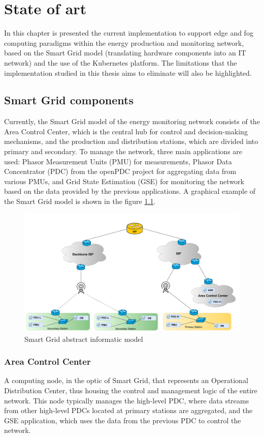 \chapter{State of art}
In this chapter is presented the current implementation to support edge and fog computing paradigms within the energy production and monitoring network, based on the Smart Grid model (translating hardware components into an IT network) and the use of the Kubernetes platform. The limitations that the implementation studied in this thesis aims to eliminate will also be highlighted.

\section{Smart Grid components}
Currently, the Smart Grid model of the energy monitoring network consists of the Area Control Center, which is the central hub for control and decision-making mechanisms, and the production and distribution stations, which are divided into primary and secondary. To manage the network, three main applications are used: Phasor Measurement Units (PMU) for measurements, Phasor Data Concentrator (PDC) from the openPDC project for aggregating data from various PMUs, and Grid State Estimation (GSE) for monitoring the network based on the data provided by the previous applications. A graphical example of the Smart Grid model is shown in the figure \ref{fig:art-state}.
\begin{figure}[!htb]\centering
\includegraphics[scale=0.17]{Pictures/state-of-art}
\caption{Smart Grid abstract informatic model}\label{fig:art-state}
\end{figure}

\subsection{Area Control Center}
A computing node, in the optic of Smart Grid, that represents an Operational Distribution Center, thus housing the control and management logic of the entire network. This node typically manages the high-level PDC, where data streams from other high-level PDCs located at primary stations are aggregated, and the GSE application, which uses the data from the previous PDC to control the network.


